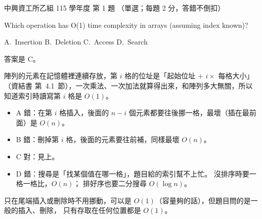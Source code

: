 \begin{pastexam}[label={px:nchu-115-is-01}]{中興資工所乙組 115 學年度 第 1 題}
（單選；每題 2 分，答錯不倒扣）

Which operation has O(1) time complexity in arrays (assuming index known)?

A.~Insertion \qquad B.~Deletion \qquad C.~Access \qquad D.~Search
\end{pastexam}

\begin{pastsoln}
答案是 C。

陣列的元素在記憶體裡連續存放，第 $i$ 格的位址是「起始位址 $+$ $i \times$ 每格大小」（資結書
第~4.1~節），一次乘法、一次加法就算得出來，和陣列多大無關，所以知道索引時讀寫第 $i$ 格是
$O(1)$。
\begin{itemize}
\item A 錯：在第 $i$ 格插入，後面的 $n - i$ 個元素都要往後挪一格，最壞（插在最前面）是 $O(n)$。
\item B 錯：刪掉第 $i$ 格，後面的元素要往前補，同樣最壞 $O(n)$。
\item C 對：見上。
\item D 錯：搜尋是「找某個值在哪一格」，題目給的索引幫不上忙。 沒排序時要一格一格比，$O(n)$；
排好序也要二分搜尋 $O(\log n)$。
\end{itemize}
只在尾端插入或刪除時不用挪動，可以是 $O(1)$（容量夠的話），但題目問的是一般的插入、刪除，
只有存取在任何位置都是 $O(1)$。
\end{pastsoln}
